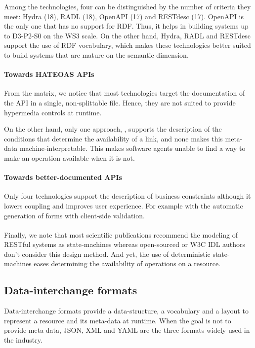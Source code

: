 Among the technologies, four can be distinguished by the number of criteria they meet: Hydra (18), RADL (18), OpenAPI (17) and RESTdesc (17).
OpenAPI is the only one that has no support for RDF. Thus, it helps in building systems up to D3-P2-S0 on the WS3 scale.
On the other hand, Hydra, RADL and RESTdesc support the use of RDF vocabulary, which makes these technologies better suited to build systems that are mature on the semantic dimension.

\paragraph{Towards HATEOAS APIs}
From the matrix, we notice that most technologies target the documentation of the API in a single, non-splittable file. Hence, they are not suited to provide hypermedia controls at runtime.

On the other hand, only one approach, \cite{Schreier:2011:MRA:1967428.1967434}, supports the description of the conditions that determine the availability of a link, and none makes this meta-data machine-interpretable. This makes software agents unable to find a way to make an operation available when it is not.

\paragraph{Towards better-documented APIs}
Only four technologies support the description of business constraints although it lowers coupling and improves user experience. For example with the automatic generation of forms with client-side validation.

\paragraph{}
Finally, we note that most scientific publications recommend the modeling of RESTful systems as state-machines whereas open-sourced or W3C IDL authors don't consider this design method. And yet, the use of deterministic state-machines eases determining the availability of operations on a resource.

\subsection{Data-interchange formats}

Data-interchange formats provide a data-structure, a vocabulary and a layout to represent a resource and its meta-data at runtime. When the goal is not to provide meta-data, JSON, XML and YAML are the three formats widely used in the industry.

